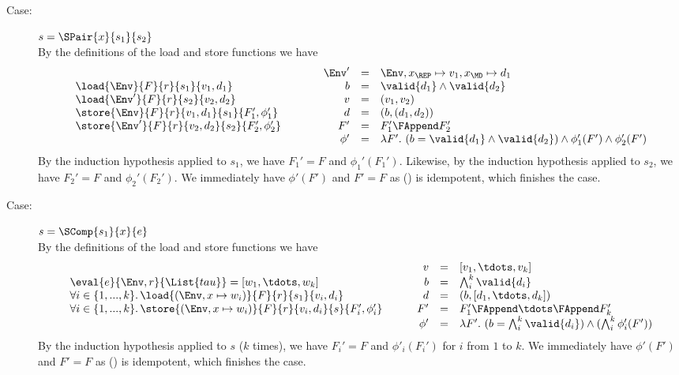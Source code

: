 {\begin{description}
\item[Case:]$s = \SPair{x}{s_1}{s_2}$\\[1ex]
%
By the definitions of the load and store functions we have 
\[ 
\begin{array}{l}
\load{\Env}{F}{r}{s_1}{v_1,d_1}\\
\load{\Env'}{F}{r}{s_2}{v_2,d_2}\\
\store{\Env}{F}{r}{v_1,d_1}{s_1}{F_1',\phi_1'}\\
\store{\Env'}{F}{r}{v_2,d_2}{s_2}{F_2',\phi_2'}\\
\end{array} \hspace*{1cm}
\begin{array}{rcl}
\Env' &=& \Env,x_{\REP} \mapsto v_1, x_{\MD} \mapsto d_1\\
b &= & \valid{d_1} \wedge \valid{d_2}\\
v &=& (v_1,v_2)\\
d &=& (b,(d_1,d_2))\\
F' &=& F_1' \FAppend F_2'\\
\phi' &=& \lambda F'.~(b = \valid{d_1} \wedge \valid{d_2}) \wedge \phi_1'(F') \wedge \phi_2'(F')\\
\end{array}
\]
By the induction hypothesis applied to $s_1$, we have $F_1' = F$ and
$\phi_1'(F_1')$. Likewise, by the induction hypothesis applied to
$s_2$, we have $F_2' = F$ and $\phi_2'(F_2')$. We immediately have
$\phi'(F')$ and $F' = F$ as (\FAppend) is idempotent, which finishes
the case.

\item[Case:] $s = \SComp{s_1}{x}{e}$\\[1ex]
%
By the definitions of the load and store functions we have 
\[ 
\begin{array}{l}
\eval{e}{\Env,r}{\List{tau}} = [w_1,\tdots,w_k ]\\
\forall i \in \{1,...,k\}.\,\load{(\Env, x \mapsto w_i)}{F}{r}{s_1}{v_i,d_i}\\
\forall i \in \{1,...,k\}.\,\store{(\Env, x \mapsto w_i)}{F}{r}{v_i,d_i}{s}{F_i',\phi_i'}\\
\end{array}\hspace*{.75cm}\begin{array}{rcl}
v &=& [v_1,\tdots,v_k]\\
b &= &\bigwedge_i^k \valid{d_i}\\
d &=& (b,[d_1,\tdots,d_k])\\
F' &=& F_1' \FAppend \tdots \FAppend F_k'\\
\phi' &=& \lambda F'.~(b = \bigwedge_i^k \valid{d_i}) \wedge (\bigwedge_i^k \phi_i'(F'))\\
\end{array}
\]
By the induction hypothesis applied to $s$ ($k$ times), we have $F_i'
= F$ and $\phi'_i(F_i')$ for $i$ from $1$ to $k$. We immediately have
$\phi'(F')$ and $F' = F$ as (\FAppend) is idempotent, which finishes
the case.


\end{description}}
